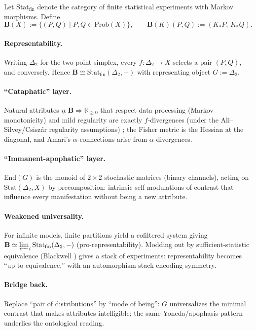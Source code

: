 \documentclass[11pt]{article}
\theoremstyle{upright}
\begin{document}
Let $\mathrm{Stat}_{\mathrm{fin}}$ denote the category of finite statistical experiments with Markov morphisms. 
Define 
\[
\mathbf{B}(X) := \{(P,Q) \mid P,Q \in \mathrm{Prob}(X)\},
\qquad 
\mathbf{B}(K)(P,Q) := (K_{\ast}P,\, K_{\ast}Q).
\]
\paragraph{Representability.}
Writing \(\Delta_2\) for the two-point simplex, every \(f:\Delta_2\to X\) selects a pair \((P,Q)\), and conversely. Hence \(\mathbf B\cong \mathrm{Stat}_{\mathrm{fin}}(\Delta_2,-)\) with representing object \(G:=\Delta_2\).
\paragraph{``Cataphatic'' layer.}
Natural attributes \(\eta:\mathbf B\Rightarrow \mathbb R_{\ge0}\) that respect data processing (Markov monotonicity) and mild regularity are exactly \(f\)-divergences (under the Ali–Silvey/Csiszár regularity assumptions) \citep{Csiszar1967}; the Fisher metric is the Hessian at the diagonal, and Amari’s \(\alpha\)-connections arise from \(\alpha\)-divergences.
\paragraph{``Immanent-apophatic'' layer.}
\(\mathrm{End}(G)\) is the monoid of \(2\times2\) stochastic matrices (binary channels), acting on \(\mathrm{Stat}(\Delta_2,X)\) by precomposition: intrinsic self-modulations of contrast that influence every manifestation without being a new attribute.
\paragraph{Weakened universality.}
For infinite models, finite partitions yield a cofiltered system giving \(\mathbf B\simeq\varprojlim_i \mathrm{Stat}_{\mathrm{fin}}(\Delta_2,-)\) (pro-representability). Modding out by sufficient-statistic equivalence (Blackwell \citep{Blackwell1953}) gives a stack of experiments: representability becomes “up to equivalence,” with an automorphism stack encoding symmetry.
\paragraph{Bridge back.}
Replace “pair of distributions” by “mode of being”: \(G\) universalizes the minimal contrast that makes attributes intelligible; the same Yoneda/apophasis pattern underlies the ontological reading.
\end{document}

